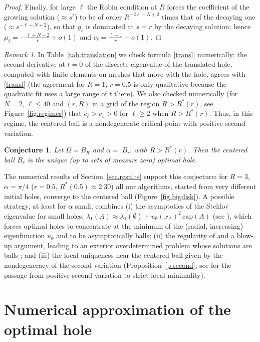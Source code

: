 \documentclass[11pt]{amsart}
\newtheorem{conjecture}[lemma]{Conjecture}
\theoremstyle{remark}
\newtheorem{remark}[lemma]{Remark}
\numberwithin{equation}{section}
\begin{document}
\begin{proof}
Finally, for large $\ell$ the Robin condition at $R$ forces the coefficient of the growing solution ($\approx s^{\ell}$) to be of order $R^{-2\ell-N+2}$ times that of the decaying one ($\approx s^{-\ell-N+2}$), so that $g_\ell$ is dominated at $s=r$ by the decaying solution; hence $\mu_\ell=-\frac{\ell+N-2}r+o(1)$ and $c_\ell=\frac{\ell-1}{r}+o(1)$.
\end{proof}

\begin{remark}
In Table~\ref{tab.translation} we check formula \eqref{transl} numerically: the second derivative at $t=0$ of the discrete eigenvalue of the translated hole, computed with finite elements on meshes that move with the hole, agrees with \eqref{transl} (the agreement for $R=1$, $r=0.5$ is only qualitative because the quadratic fit uses a large range of $t$ there). We also checked numerically (for $N=2$, $\ell\le40$ and $(r,R)$ in a grid of the region $R>R^*(r)$, see Figure~\ref{fig.regimes}) that $c_\ell>c_1>0$ for $\ell\ge2$ when $R>R^*(r)$. Thus, in this regime, the centered ball is a nondegenerate critical point with positive second variation.
\end{remark}

\begin{conjecture}\label{conj}
Let $\Omega=B_R$ and $\alpha=|B_r|$ with $R>R^*(r)$. Then the centered ball $B_r$ is the unique (up to sets of measure zero) optimal hole.
\end{conjecture}

The numerical results of Section~\ref{sec.results} support this conjecture: for $R=3$, $\alpha=\pi/4$ ($r=0.5$, $R^*(0.5)\approx2.30$) all our algorithms, started from very different initial holes, converge to the centered ball (Figure~\ref{fig.bigdisk}). A possible strategy, at least for $\alpha$ small, combines (i) the asymptotics of the Steklov eigenvalue for small holes, $\lambda_1(A)\approx\lambda_1(\emptyset)+u_\emptyset(x_A)^2\,\mathrm{cap}(A)$ (see \cite{Fl}), which forces optimal holes to concentrate at the minimum of the (radial, increasing) eigenfunction $u_\emptyset$ and to be asymptotically balls; (ii) the regularity of \cite{FBRW2} and a blow-up argument, leading to an exterior overdetermined problem whose solutions are balls \cite{Re}; and (iii) the local uniqueness near the centered ball given by the nondegeneracy of the second variation (Proposition~\ref{p.second}; see \cite{DP} for the passage from positive second variation to strict local minimality).

\section{Numerical approximation of the optimal hole}\label{sec.num}
\end{document}

